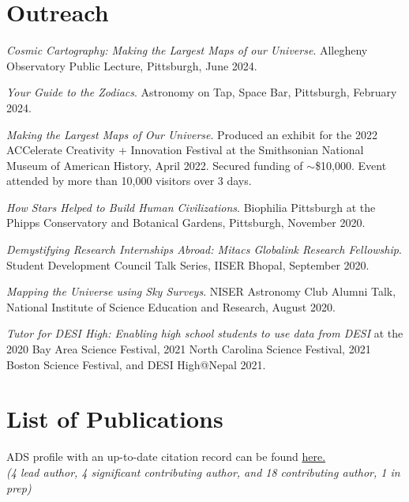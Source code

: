 \documentclass[10pt,a4paper,roman,]{moderncv} %
\begin{document}
\section{Outreach}

 \begin{etaremune}[leftmargin=40pt,labelsep=10pt]
 \item \textit{Cosmic Cartography: Making the Largest Maps of our Universe}. Allegheny Observatory Public Lecture, Pittsburgh, June 2024.
 \item \textit{Your Guide to the Zodiacs}. Astronomy on Tap, Space Bar, Pittsburgh, February 2024.
 \item \textit{Making the Largest Maps of Our Universe}. Produced an exhibit for the 2022 ACCelerate Creativity + Innovation Festival at the Smithsonian National Museum of American History, April 2022. Secured funding of $\sim$\$10,000. Event attended by more than 10,000 visitors over 3 days. 
 \item \textit{How Stars Helped to Build Human Civilizations}. Biophilia Pittsburgh at the Phipps Conservatory and Botanical Gardens, Pittsburgh, November 2020.
\item \textit{Demystifying Research Internships Abroad: Mitacs Globalink Research Fellowship}. Student Development
Council Talk Series, IISER Bhopal, September 2020.
\item \textit{Mapping the Universe using Sky Surveys}. NISER Astronomy Club Alumni Talk, National Institute of Science Education and Research, August 2020.
\item \textit{Tutor for DESI High: Enabling high school students to use data from DESI} at the 2020 Bay Area Science Festival, 2021 North Carolina Science Festival, 2021 Boston Science Festival, and DESI High@Nepal 2021.
\end{etaremune}

\clearpage
\section{List of Publications}
\begin{center}
ADS profile with an up-to-date citation record can be found \href{https://ui.adsabs.harvard.edu/search/p_=0&q=orcid\%3A0000-0002-5665-7912&sort=date\%20desc\%2C\%20bibcode\%20desc}{here.} \\
    \textit{(4 lead author, 4 significant contributing author, and 18 contributing author, 1 in prep)\\}
    
    

\end{center}
\end{document}
